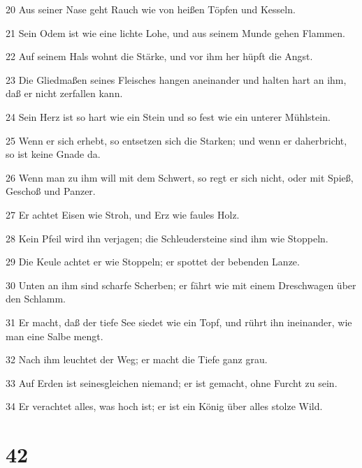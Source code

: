 \par 20 Aus seiner Nase geht Rauch wie von heißen Töpfen und Kesseln.
\par 21 Sein Odem ist wie eine lichte Lohe, und aus seinem Munde gehen Flammen.
\par 22 Auf seinem Hals wohnt die Stärke, und vor ihm her hüpft die Angst.
\par 23 Die Gliedmaßen seines Fleisches hangen aneinander und halten hart an ihm, daß er nicht zerfallen kann.
\par 24 Sein Herz ist so hart wie ein Stein und so fest wie ein unterer Mühlstein.
\par 25 Wenn er sich erhebt, so entsetzen sich die Starken; und wenn er daherbricht, so ist keine Gnade da.
\par 26 Wenn man zu ihm will mit dem Schwert, so regt er sich nicht, oder mit Spieß, Geschoß und Panzer.
\par 27 Er achtet Eisen wie Stroh, und Erz wie faules Holz.
\par 28 Kein Pfeil wird ihn verjagen; die Schleudersteine sind ihm wie Stoppeln.
\par 29 Die Keule achtet er wie Stoppeln; er spottet der bebenden Lanze.
\par 30 Unten an ihm sind scharfe Scherben; er fährt wie mit einem Dreschwagen über den Schlamm.
\par 31 Er macht, daß der tiefe See siedet wie ein Topf, und rührt ihn ineinander, wie man eine Salbe mengt.
\par 32 Nach ihm leuchtet der Weg; er macht die Tiefe ganz grau.
\par 33 Auf Erden ist seinesgleichen niemand; er ist gemacht, ohne Furcht zu sein.
\par 34 Er verachtet alles, was hoch ist; er ist ein König über alles stolze Wild.

\chapter{42}

